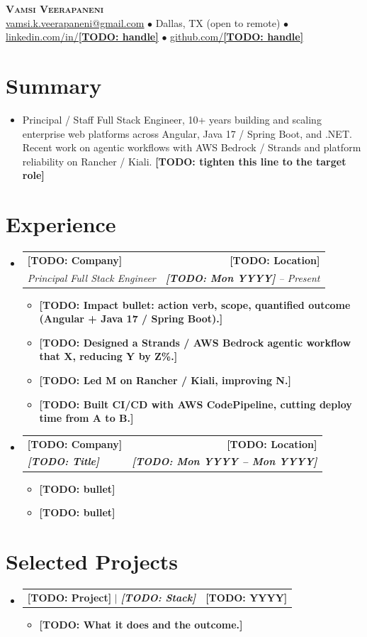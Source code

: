 \documentclass[letterpaper,11pt]{article}
\makeatletter
\newcommand{\TODO}[1]{{\bfseries [TODO: #1]}}
\newcommand{\resumeItem}[1]{
  \item\small{
    {#1 \vspace{-2pt}}
  }
}
\newcommand{\resumeSubheading}[4]{
  \vspace{-2pt}\item
    \begin{tabular*}{0.97\textwidth}[t]{l@{\extracolsep{\fill}}r}
      \textbf{#1} & #2 \\
      \textit{\small#3} & \textit{\small #4} \\
    \end{tabular*}\vspace{-7pt}
}
\newcommand{\resumeProjectHeading}[2]{
    \item
    \begin{tabular*}{0.97\textwidth}{l@{\extracolsep{\fill}}r}
      \small#1 & #2 \\
    \end{tabular*}\vspace{-7pt}
}
\newcommand{\resumeSubHeadingListStart}{\begin{itemize}[leftmargin=0.15in, label={}]}
\newcommand{\resumeSubHeadingListEnd}{\end{itemize}}
\newcommand{\resumeItemListStart}{\begin{itemize}}
\newcommand{\resumeItemListEnd}{\end{itemize}\vspace{-5pt}}
\makeatother
\begin{document}
\begin{center}
    \textbf{\Huge \scshape Vamsi Veerapaneni} \\ \vspace{1pt}
    \small
    \href{mailto:vamsi.k.veerapaneni@gmail.com}{\underline{vamsi.k.veerapaneni@gmail.com}} $\bullet$
    Dallas, TX (open to remote) $\bullet$
    \href{https://www.linkedin.com/in/vveerapaneni}{\underline{linkedin.com/in/\TODO{handle}}} $\bullet$
    \href{https://github.com/vveerapaneni}{\underline{github.com/\TODO{handle}}}
\end{center}

\section{Summary}
\resumeSubHeadingListStart
  \resumeItem{Principal / Staff Full Stack Engineer, 10+ years building and scaling enterprise web platforms across Angular, Java 17 / Spring Boot, and .NET. Recent work on agentic workflows with AWS Bedrock / Strands and platform reliability on Rancher / Kiali. \TODO{tighten this line to the target role}}
\resumeSubHeadingListEnd

\section{Experience}
\resumeSubHeadingListStart

  \resumeSubheading
    {\TODO{Company}}{\TODO{Location}}
    {Principal Full Stack Engineer}{\TODO{Mon YYYY} -- Present}
    \resumeItemListStart
      \resumeItem{\TODO{Impact bullet: action verb, scope, quantified outcome (Angular + Java 17 / Spring Boot).}}
      \resumeItem{\TODO{Designed a Strands / AWS Bedrock agentic workflow that X, reducing Y by Z\%.}}
      \resumeItem{\TODO{Led M on Rancher / Kiali, improving N.}}
      \resumeItem{\TODO{Built CI/CD with AWS CodePipeline, cutting deploy time from A to B.}}
    \resumeItemListEnd

  \resumeSubheading
    {\TODO{Company}}{\TODO{Location}}
    {\TODO{Title}}{\TODO{Mon YYYY -- Mon YYYY}}
    \resumeItemListStart
      \resumeItem{\TODO{bullet}}
      \resumeItem{\TODO{bullet}}
    \resumeItemListEnd

\resumeSubHeadingListEnd

\section{Selected Projects}
\resumeSubHeadingListStart
  \resumeProjectHeading
    {\textbf{\TODO{Project}} $|$ \emph{\TODO{Stack}}}{\TODO{YYYY}}
    \resumeItemListStart
      \resumeItem{\TODO{What it does and the outcome.}}
    \resumeItemListEnd
\resumeSubHeadingListEnd
\end{document}
